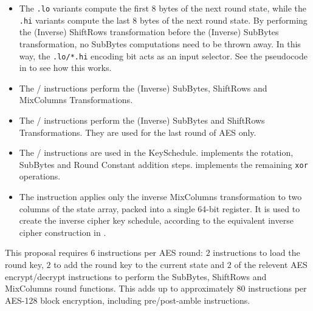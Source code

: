 \begin{itemize}
\item
The {\tt *.lo} variants compute the first 8 bytes of the next round
state, while the {\tt *.hi} variants compute the last 8 bytes of the
next round state.
By performing the (Inverse) ShiftRows transformation before the
(Inverse) SubBytes transformation, no SubBytes computations need to be
thrown away.
In this way, the {\tt *.lo/*.hi} encoding bit acts as an input selector.
See the pseudocode in  to see how this works.
\item
The / instructions perform the
(Inverse) SubBytes, ShiftRows and MixColumns Transformations.
\item
The / instructions perform the
(Inverse) SubBytes and ShiftRows Transformations.
They are used for the last round of AES only.
\item
The / instructions are used in the
KeySchedule.
 implements the rotation, SubBytes and Round Constant
addition steps.
 implements the remaining {\tt xor} operations.
\item
The  instruction applies only the inverse MixColumns
transformation to two columns of the state array, packed into a single
64-bit register.
It is used to create the inverse cipher key schedule, according to
the equivalent inverse cipher construction in
\cite[Page 23, Section 5.3.5]{nist:fips:197}.
\end{itemize}

This proposal requires $6$ instructions per AES round:
$2$  instructions to load the round key,
$2$  to add the round key to the current state
and
$2$ of the relevent AES encrypt/decrypt instructions to perform the
    SubBytes, ShiftRows and MixColumns round functions.
This adds up to approximately $80$ instructions per AES-128 block
encryption, including pre/post-amble instructions.

